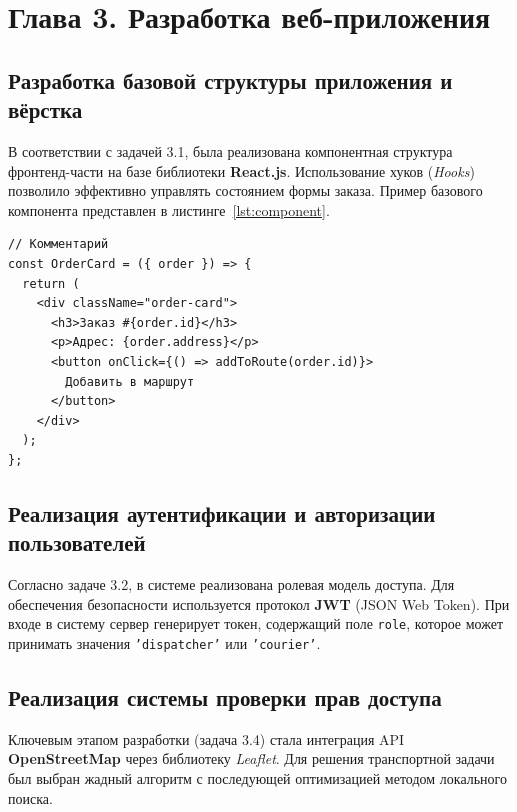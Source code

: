 
\section*{Глава 3. Разработка веб-приложения}

\subsection{Разработка базовой структуры приложения и вёрстка}

В соответствии с задачей 3.1, была реализована компонентная структура фронтенд-части
на базе библиотеки \textbf{React.js}. Использование хуков (\textit{Hooks}) позволило
эффективно управлять состоянием формы заказа. Пример базового компонента представлен
в листинге~\ref{lst:component}.

\begin{lstlisting}[caption={Пример структуры компонента карточки заказа}, label={lst:component}]
// Комментарий 
const OrderCard = ({ order }) => {
  return (
    <div className="order-card">
      <h3>Заказ #{order.id}</h3>
      <p>Адрес: {order.address}</p>
      <button onClick={() => addToRoute(order.id)}>
        Добавить в маршрут
      </button>
    </div>
  );
};
\end{lstlisting}

\subsection{Реализация аутентификации и авторизации пользователей}

Согласно задаче 3.2, в системе реализована ролевая модель доступа. Для обеспечения
безопасности используется протокол \textbf{JWT} (JSON Web Token). При входе в
систему сервер генерирует токен, содержащий поле \texttt{role}, которое может
принимать значения \texttt{'dispatcher'} или \texttt{'courier'}.

\subsection{Реализация системы проверки прав доступа}

Ключевым этапом разработки (задача 3.4) стала интеграция API \linebreak \textbf{OpenStreetMap}
через библиотеку \textit{Leaflet}. Для решения транспортной задачи был выбран
жадный алгоритм с последующей оптимизацией методом локального поиска.

